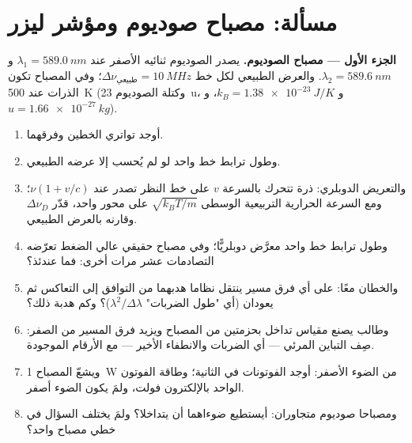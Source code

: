 \section{مسألة: مصباح صوديوم ومؤشر ليزر}

\begin{problem}
\label{pb:b2:scalar-light-model:1}

\medskip
\noindent\textbf{الجزء الأول --- مصباح الصوديوم.}
يصدر الصوديوم ثنائيه الأصفر عند $\lambda_1 = \qty{589.0}{nm}$ و $\lambda_2 =
\qty{589.6}{nm}$. والعرض الطبيعي لكل خط $\Delta\nu_{\text{طبيعي}} =
\qty{10}{MHz}$؛ وفي المصباح تكون الذرات عند \qty{500}{K} (وكتلة الصوديوم
\qty{23}{u}، و $k_B = \qty{1.38e-23}{J/K}$، و $u = \qty{1.66e-27}{kg}$).
\begin{enumerate}
  \item أوجد تواتري الخطين وفرقهما.
  \item وطول ترابط خط واحد لو لم يُحسب إلا عرضه
        الطبيعي.
  \item والتعريض الدوبلري: ذرة تتحرك بالسرعة $v$ على خط
        النظر تصدر عند $\nu(1 + v/c)$؛ ومع السرعة الحرارية التربيعية الوسطى $\sqrt{k_BT
        /m}$ على محور واحد، قدّر $\Delta\nu_D$ وقارنه بالعرض
        الطبيعي.
  \item وطول ترابط خط واحد معرَّض دوبلريًّا؛ وفي مصباح
        حقيقي عالي الضغط تعرّضه التصادمات عشر مرات
        أخرى: فما  عندئذ؟
  \item والخطان معًا: على أي فرق مسير ينتقل نظاما هدبهما
        من التوافق إلى التعاكس ثم يعودان
        (أي "طول الضربات" $\lambda^2/\Delta\lambda$)؟ وكم هدبة ذلك؟
  \item وطالب يصنع مقياس تداخل بحزمتين من المصباح
        ويزيد فرق المسير من الصفر: صِف
        التباين المرئي --- أي الضربات والانطفاء الأخير --- مع
        الأرقام الموجودة.
  \item ويشعّ المصباح \qty{1}{W} من الضوء الأصفر: أوجد الفوتونات في الثانية؛
        وطاقة الفوتون الواحد بالإلكترون فولت، ولمَ يكون الضوء أصفر.
  \item ومصباحا صوديوم متجاوران: أيستطيع ضوءاهما أن يتداخلا؟
        ولمَ يختلف السؤال في خطي مصباح واحد؟
\end{enumerate}


\end{problem}
